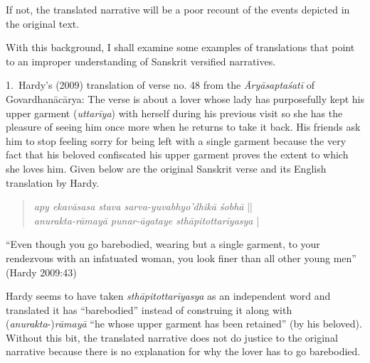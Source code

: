If not, the translated narrative will be a poor recount of the events depicted in the original text. 

With this background, I shall examine some examples of translations that point to an improper understanding of Sanskrit versified narratives.  

1.~Hardy’s (2009) translation of verse no. 48 from the \textsl{Āryāsaptaśatī} of Govardhanācārya: The verse is about a lover whose lady has purposefully kept his upper garment (\textsl{uttarīya}) with herself during his previous visit so she has the pleasure of seeing him once more when he returns to take it back. His friends ask him to stop feeling sorry for being left with a single garment because the very fact that his beloved confiscated his upper garment proves the extent to which she loves him. Given below are the original Sanskrit verse and its English translation by Hardy. 
\begin{quote}
\textsl{apy ekavāsasa stava sarva-yuvabhyo’dhikā śobhā}  ||\\
\textsl{anurakta-rāmayā punar-āgataye sthāpitottarīyasya} |
\end{quote}

\begin{myquote}
“Even though you go barebodied, wearing but a single garment, to your rendezvous with an infatuated woman, you look finer than all other young men” 
\hfill(Hardy 2009:43)
\end{myquote}

Hardy seems to have taken \textsl{sthāpitottarīyasya }as an independent word and translated it has “barebodied” instead of construing it along with (\textsl{anurakta}-)\textsl{rāmayā}  “he whose upper garment has been retained” (by his beloved). Without this bit, the translated narrative does not do justice to the original narrative because there is no explanation for why the lover has to go barebodied.


